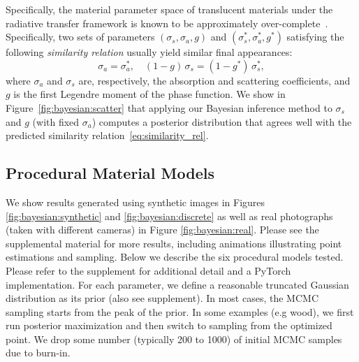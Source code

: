

Specifically, the material parameter space of translucent materials under the radiative transfer framework \cite{chandrasekhar1960radiative} is known to be approximately over-complete~\cite{zhao2014high}.
Specifically, two sets of parameters $(\sigma_s, \sigma_a, g)$ and $(\sigma_s^*, \sigma_a^*, g^*)$ satisfying the following \emph{similarity relation} usually yield similar final appearances:
\begin{equation}
	\label{eq:similarity_rel}
	\sigma_a = \sigma_a^*, \quad (1 - g)\,\sigma_s = (1 - g^*)\,\sigma_s^*,
\end{equation}
where $\sigma_a$ and $\sigma_s$ are, respectively, the absorption and scattering coefficients, and $g$ is the first Legendre moment of the phase function.
We show in Figure~\ref{fig:bayesian:scatter} that applying our Bayesian inference method to $\sigma_s$ and $g$ (with fixed $\sigma_a$) computes a posterior distribution that agrees well with the predicted similarity relation~\eqref{eq:similarity_rel}.


\subsection{Procedural Material Models}
\label{ssec:proc_models}

We show results generated using synthetic images in Figures \ref{fig:bayesian:synthetic} and \ref{fig:bayesian:discrete} as well as real photographs (taken with different cameras) in Figure \ref{fig:bayesian:real}.
Please see the supplemental material for more results, including animations illustrating point estimations and sampling. Below we describe the six procedural models tested. Please refer to the supplement for additional detail and a \textsf{PyTorch} implementation. For each parameter, we define a reasonable truncated Gaussian distribution as its prior (also see supplement). In most cases, the MCMC sampling starts from the peak of the prior. In some examples (e.g wood), we first run posterior maximization and then switch to sampling from the optimized point. We drop some number (typically 200 to 1000) of initial MCMC samples due to burn-in.









